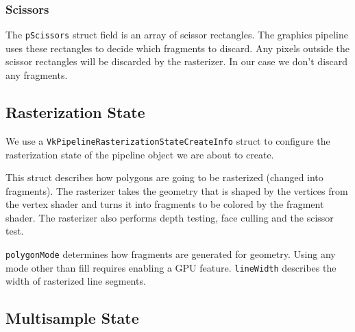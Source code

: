 \begin{minipage}{\linewidth}{\noindent}
    
\end{minipage}

\subsubsection{Scissors}

The \texttt{pScissors} struct field
is an array of scissor rectangles.
The graphics pipeline uses these rectangles to decide which fragments to discard.
Any pixels outside the scissor rectangles will be discarded by the rasterizer.
In our case we don't discard any fragments.

\begin{minipage}{\linewidth}{\noindent}
    
\end{minipage}

\subsection{Rasterization State}

We use a \texttt{VkPipelineRasterizationStateCreateInfo} struct to configure
the rasterization state of the pipeline object we are about to create.

This struct describes how polygons are going to be rasterized
(changed into fragments).
The rasterizer takes the geometry that is shaped by the vertices from the
vertex shader and turns it into fragments to be colored by the fragment shader.
The rasterizer also performs depth testing, face culling and the scissor test.

\texttt{polygonMode} determines how fragments are generated for geometry.
Using any mode other than fill requires enabling a GPU feature.
\texttt{lineWidth} describes the width of rasterized line segments.

\begin{minipage}{\linewidth}{\noindent}
    
\end{minipage}

\subsection{Multisample State}


